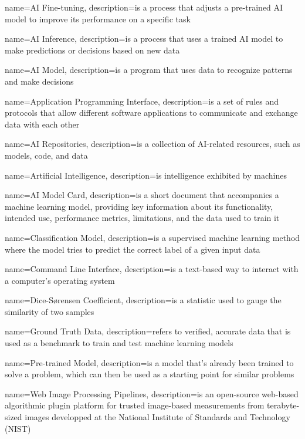 
{
    name=AI Fine-tuning,
    description={is a process that adjusts a pre-trained AI model to improve
    its performance on a specific task}
}

{
    name=AI Inference,
    description={is a process that uses a trained AI model to make predictions
    or decisions based on new data}
}

{
    name=AI Model,
    description={is a program that uses data to recognize patterns and make
    decisions}
}

{
    name=Application Programming Interface,
    description={is a set of rules and protocols that allow different software
    applications to communicate and exchange data with each other}
}

{
    name=AI Repositories,
    description={is a collection of AI-related resources, such as models, code,
    and data}
}

{
    name=Artificial Intelligence,
    description={is intelligence exhibited by machines}
}

{
    name=AI Model Card,
    description={is a short document that accompanies a machine learning model,
    providing key information about its functionality, intended use,
    performance metrics, limitations, and the data used to train it}
}

{
    name=Classification Model,
    description={is a supervised machine learning method where the model tries
    to predict the correct label of a given input data}
}

{
    name=Command Line Interface,
    description={is a text-based way to interact with a computer's operating
    system}
}

{
    name=Dice-Sørensen Coefficient,
    description={is a statistic used to gauge the similarity of two samples}
}

{
    name=Ground Truth Data,
    description={refers to verified, accurate data that is used as a benchmark
    to train and test machine learning models}
}

{
    name=Pre-trained Model,
    description={is a model that's already been trained to solve a problem,
    which can then be used as a starting point for similar problems}
}

{
    name=Web Image Processing Pipelines,
    description={is an open-source web-based algorithmic plugin platform for
    trusted image-based measurements from terabyte-sized images developped at
    the National Institute of Standards and Technology (NIST)}
}

